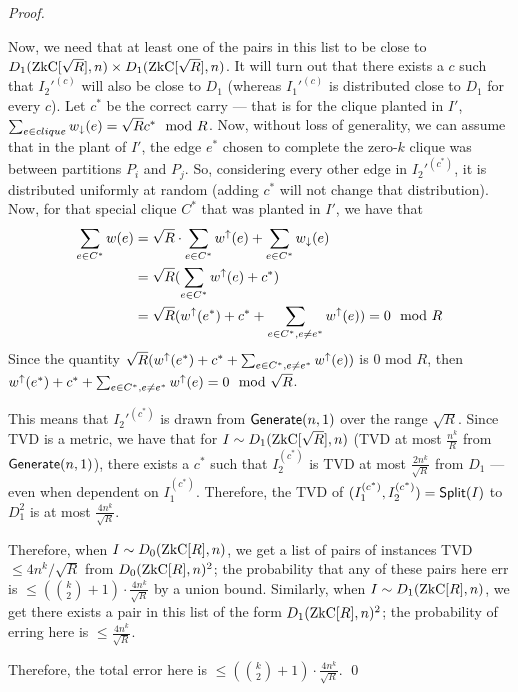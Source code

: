 \begin{proof}
\begin{itemize}
		Now, we need that at least one of the pairs in this list to be close to $D_1(\ZkC[\sqrt R], n) \times D_1(\ZkC[\sqrt R], n) $. It will turn out that there exists a $c$ such that $I_2'^{(c)}$ will also be close to $D_1$ (whereas $I_1'^{(c)}$ is distributed close to $D_1$ for every $c$). Let $c^*$ be the correct carry --- that is for the clique planted in $I'$, $\sum_{e \in clique} {w}_\downarrow(e) = \sqrt R c^* \mod R$. Now, without loss of generality, we can assume that in the plant of $I'$, the edge $e^*$ chosen to complete the zero-$k$ clique was between partitions $P_i$ and $P_j$. So, considering every other edge in $I_2'^{(c^*)}$, it is distributed uniformly at random (adding $c^*$ will not change that distribution). Now, for that special clique $C^*$ that was planted in $I'$, we have that
		\begin{align*}
		\sum_{e \in C^*} w(e) &= \sqrt R \cdot \sum_{e \in C^*} {w}^\uparrow(e) + \sum_{e \in C^*} {w}_\downarrow(e)\\
		&= \sqrt R (\sum_{e \in C^*} {w}^\uparrow(e) + c^*)\\
		&= \sqrt R ({w}^\uparrow(e^*) + c^* + \sum_{e \in C^*, e \neq e^*} {w}^\uparrow(e)) = 0 \mod R
		\end{align*}
		Since the quantity $\sqrt R ({w}^\uparrow(e^*) + c^* + \sum_{e \in C^*, e \neq e^*} {w}^\uparrow(e))$ is 0 mod $R$, then ${w}^\uparrow(e^*) + c^* + \sum_{e \in C^*, e \neq e^*} {w}^\uparrow(e) = 0 \mod \sqrt R$.
		
		This means that $I_2'^{(c^*)}$ is drawn from $\mathsf{Generate}(n,1)$ over the range $\sqrt R$. Since TVD is a metric, we have that for $I \sim D_1(\ZkC[\sqrt R], n)$ (TVD at most $\frac {n^k}{R}$ from $\mathsf{Generate}(n, 1)$), there exists a $c^*$ such that $I_2^{(c^*)}$ is TVD at most $\frac{2n^k}{\sqrt R}$ from $D_1$ --- even when dependent on $I_1^{(c^*)}$. Therefore, the TVD of $(I_1^{(c^*)}, I_2^{(c^*)}) = \mathsf{Split}(I)$ to $D_1^2$ is at most $\frac{4 n^k}{\sqrt R}$.
	\end{itemize}
	Therefore, when $I \sim D_0(\ZkC[R], n)$, we get a list of pairs of instances TVD $\le 4n^k / \sqrt R$ from $D_0(\ZkC[R], n)^2$; the probability that any of these pairs here err is $\le(\binom k 2 + 1) \cdot \frac{4n^k}{\sqrt R}$ by a union bound. Similarly, when $I \sim D_1(\ZkC[R], n)$, we get there exists a pair in this list of the form $D_1(\ZkC[R], n)^2$; the probability of erring here is $\le \frac{4 n^k }{\sqrt R}.$
	
	Therefore, the total error here is $\le (\binom k 2 + 1) \cdot \frac{4n^k}{\sqrt R}$.
	\qed
\end{proof}

